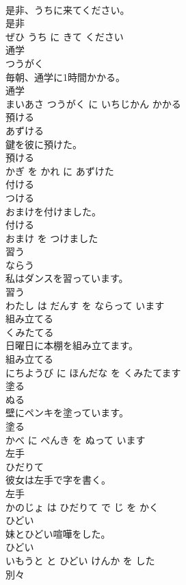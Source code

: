 \documentclass[8pt]{extreport}
\begin{document}
\begin{CJK}{UTF8}{min}
\\	是非、うちに来てください。	
\\	是非 
\\	ぜひ うち に きて ください			
\\	通学	
\\	つうがく			
\\	毎朝、通学に1時間かかる。	
\\	通学 
\\	まいあさ つうがく に いちじかん かかる			
\\	預ける	
\\	あずける			
\\	鍵を彼に預けた。	
\\	預ける 
\\	かぎ を かれ に あずけた			
\\	付ける	
\\	つける			
\\	おまけを付けました。	
\\	付ける 
\\	おまけ を つけました			
\\	習う	
\\	ならう			
\\	私はダンスを習っています。	
\\	習う 
\\	わたし は だんす を ならって います			
\\	組み立てる	
\\	くみたてる			
\\	日曜日に本棚を組み立てます。	
\\	組み立てる 
\\	にちようび に ほんだな を くみたてます			
\\	塗る	
\\	ぬる			
\\	壁にペンキを塗っています。	
\\	塗る 
\\	かべ に ぺんき を ぬって います			
\\	左手	
\\	ひだりて			
\\	彼女は左手で字を書く。	
\\	左手 
\\	かのじょ は ひだりて で じ を かく			
\\	ひどい	
\\	妹とひどい喧嘩をした。	
\\	ひどい 
\\	いもうと と ひどい けんか を した			
\\	別々	

\end{CJK}
\end{document}
